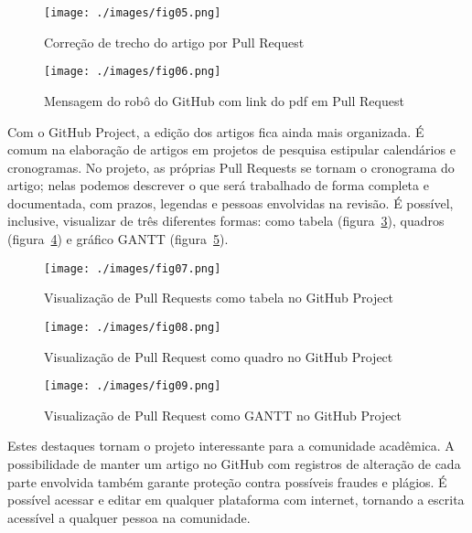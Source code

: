 \begin{figure}[H]
	\centering
	\texttt{[image: ./images/fig05.png]}
	\caption{Correção de trecho do artigo por Pull Request}
	\label{fig:fig05}
\end{figure}

\begin{figure}[H]
	\centering
	\texttt{[image: ./images/fig06.png]}
	\caption{Mensagem do robô do GitHub com link do pdf em Pull Request}
	\label{fig:fig06}
\end{figure}

Com o GitHub Project, a edição dos artigos fica ainda mais organizada. É comum na elaboração de artigos em projetos de pesquisa estipular calendários e cronogramas. No projeto, as próprias Pull Requests se tornam o cronograma do artigo; nelas podemos descrever o que será trabalhado de forma completa e documentada, com prazos, legendas e pessoas envolvidas na revisão. É possível, inclusive, visualizar de três diferentes formas: como tabela (figura~\ref{fig:fig07}), quadros (figura~\ref{fig:fig08}) e gráfico GANTT (figura~\ref{fig:fig09}).

\begin{figure}[H]
	\centering
	\texttt{[image: ./images/fig07.png]}
	\caption{Visualização de Pull Requests como tabela no GitHub Project}
	\label{fig:fig07}
\end{figure}

\begin{figure}[ht]
	\centering
	\texttt{[image: ./images/fig08.png]}
	\caption{Visualização de Pull Request como quadro no GitHub Project}
	\label{fig:fig08}
\end{figure}

\begin{figure}[ht]
	\centering
	\texttt{[image: ./images/fig09.png]}
	\caption{Visualização de Pull Request como GANTT no GitHub Project}
	\label{fig:fig09}
\end{figure}

Estes destaques tornam o projeto interessante para a comunidade acadêmica. A possibilidade de manter um artigo no GitHub com registros de alteração de cada parte envolvida também garante proteção contra possíveis fraudes e plágios. É possível acessar e editar em qualquer plataforma com internet, tornando a escrita acessível a qualquer pessoa na comunidade.

